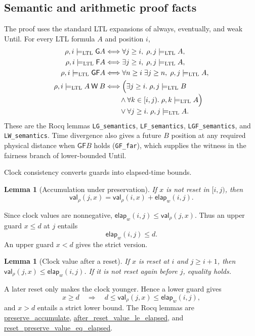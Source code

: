 \documentclass[10pt,journal,compsoc]{IEEEtran}
\newtheorem{lemma}[theorem]{Lemma}
\newcommand{\satL}{\models_{\mathrm{LTL}}}
\newcommand{\Always}{\mathsf{G}}
\newcommand{\Eventually}{\mathsf{F}}
\newcommand{\WeakUntil}{\mathbin{\mathsf{W}}}
\newcommand{\CVal}{\mathsf{val}}
\newcommand{\elapsed}{\mathsf{elap}}
\newcommand{\Rocqid}[1]{{\small\url{#1}}}
\begin{document}
\subsection{Semantic and arithmetic proof facts}
\label{subsec:main-proof-facts}
The proof uses the standard LTL expansions of always, eventually, and weak
Until. For every LTL formula $A$ and position $i$,
\begin{align}
\rho,i\satL \Always A &\Longleftrightarrow
  \forall j\ge i,\;\rho,j\satL A,\nonumber\\
\rho,i\satL \Eventually A &\Longleftrightarrow
  \exists j\ge i,\;\rho,j\satL A,\nonumber\\
\rho,i\satL \Always\Eventually A &\Longleftrightarrow
  \forall n\ge i\;\exists j\ge n,\;\rho,j\satL A,\label{eq:main-sem-GF}\\
\rho,i\satL A\WeakUntil B &\Longleftrightarrow
  \Bigl(\exists j\ge i.\;\rho,j\satL B\\[-1mm]
  &\qquad\land\forall k\in[i,j).\;\rho,k\satL A\Bigr)\nonumber\\[-1mm]
  &\qquad\lor\forall j\ge i.\;\rho,j\satL A.\nonumber
\end{align}
These are the Rocq lemmas \texttt{LG\_semantics},
\texttt{LF\_semantics}, \texttt{LGF\_semantics}, and
\texttt{LW\_semantics}. Time divergence also gives a future $B$ position at
any required physical distance when $\Always\Eventually B$ holds
(\texttt{GF\_far}), which supplies the witness in the fairness branch of
lower-bounded Until.

Clock consistency converts guards into elapsed-time bounds.
\begin{lemma}[Accumulation under preservation]
\label{lem:clock-accumulation}
If $x$ is not reset in $[i,j)$, then
\[
\CVal_\rho(j,x)=\CVal_\rho(i,x)+\elapsed_w(i,j).
\]
\end{lemma}
Since clock values are nonnegative, $\elapsed_w(i,j)\le\CVal_\rho(j,x)$.
Thus an upper guard $x\le d$ at $j$ entails
\begin{equation}
\elapsed_w(i,j)\le d.
\label{eq:upper-clock}
\end{equation}
An upper guard $x<d$ gives the strict version.

\begin{lemma}[Clock value after a reset]
\label{lem:clock-after-reset}
If $x$ is reset at $i$ and $j\ge i+1$, then
$\CVal_\rho(j,x)\le\elapsed_w(i,j)$. If it is not reset again before $j$,
equality holds.
\end{lemma}
A later reset only makes the clock younger. Hence a lower guard gives
\begin{equation}
x\ge d\quad\Longrightarrow\quad
d\le\CVal_\rho(j,x)\le\elapsed_w(i,j),
\label{eq:lower-clock}
\end{equation}
and $x>d$ entails a strict lower bound. The Rocq lemmas are
\Rocqid{preserve_accumulate},
\Rocqid{after_reset_value_le_elapsed}, and
\Rocqid{reset_preserve_value_eq_elapsed}.
\end{document}
